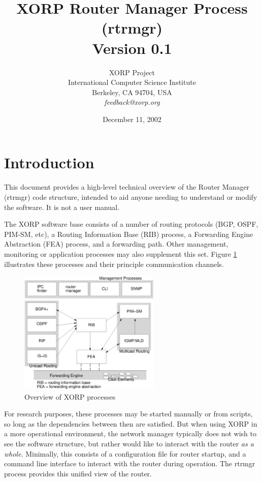 \documentclass[11pt]{article}
\title{XORP Router Manager Process (rtrmgr) \\
\vspace{1ex}
Version 0.1}
\author{ XORP Project					\\
	 International Computer Science Institute	\\
	 Berkeley, CA 94704, USA			\\
	 {\it feedback@xorp.org}
}
\date{December 11, 2002}
\begin{document}
\maketitle                            
\section{Introduction}
This document provides a high-level technical overview of the Router
Manager (rtrmgr) code structure, intended to aid anyone needing to
understand or modify the software.   It is not a user manual.

The XORP software base consists of a number of routing protocols (BGP,
OSPF, PIM-SM, etc), a Routing Information Base (RIB) process, a
Forwarding Engine Abstraction (FEA) process, and a forwarding path.
Other management, monitoring or application processes may also
supplement this set.  Figure \ref{overview} illustrates these
processes and their principle communication channels.

\begin{figure}[htb]
\centerline{\includegraphics[width=0.6\textwidth]{figs/processes3}}
\vspace{.05in}
\caption{\label{overview}Overview of XORP processes}
\end{figure}

For research purposes, these processes may be started manually or from
scripts, so long as the dependencies between then are satisfied.  But
when using XORP in a more operational environment, the network manager
typically does not wish to see the software structure, but rather
would like to interact with the router {\it as a whole}.  Minimally, this
consists of a configuration file for router startup, and a command
line interface to interact with the router during operation.  The
rtrmgr process provides this unified view of the router.
\end{document}
